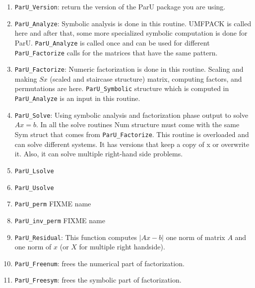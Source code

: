 \documentclass[12pt]{article}
\begin{document}
\begin{enumerate}

    \item \verb'ParU_Version': return the version of the ParU package 
        you are using.

    \item \verb'ParU_Analyze': Symbolic analysis is done in this routine. 
        UMFPACK is called here and after that, some more specialized symbolic
        computation is done for ParU. 
        \verb'ParU_Analyze' is called once and can be used for different 
        \verb'ParU_Factorize' calls for the matrices that have the same pattern.
    \item \verb'ParU_Factorize': 
        Numeric factorization is done in this routine. Scaling and
        making $Sx$ (scaled and staircase structure) matrix, computing factors,
        and permutations are here. \verb'ParU_Symbolic' structure which is 
        computed in \verb'ParU_Analyze' is an input in this routine.

    \item \verb'ParU_Solve':  
        Using symbolic analysis and factorization phase output to solve $Ax=b$.
        In all the solve routines Num structure must come with the same 
        Sym struct that comes from \verb'ParU_Factorize'. 
        This routine is overloaded and can solve different systems. It has 
        versions that keep a copy of x or overwrite it. Also, it can solve 
        multiple right-hand side problems.

    \item \verb'ParU_Lsolve'
    \item \verb'ParU_Usolve'
    \item \verb'ParU_perm' FIXME name
    \item \verb'ParU_inv_perm' FIXME name

    \item \verb'ParU_Residual':  
        This function computes $|Ax-b|$ one norm of matrix $A$ and one norm of
        $x$ (or $X$ for multiple right handside).

    \item \verb'ParU_Freenum':  frees the numerical part of factorization.

    \item \verb'ParU_Freesym':  frees the symbolic part of factorization.

\end{enumerate}
\end{document}

